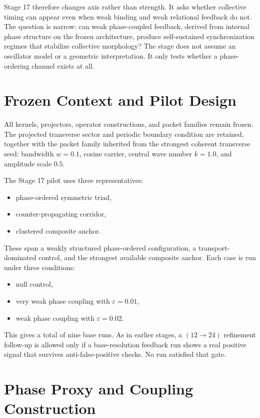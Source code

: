 \documentclass[11pt]{article}
\begin{document}
Stage 17 therefore changes axis rather than strength. It asks whether collective timing can appear even when weak binding and weak relational feedback do not. The question is narrow: can weak phase-coupled feedback, derived from internal phase structure on the frozen architecture, produce self-sustained synchronization regimes that stabilize collective morphology? The stage does not assume an oscillator model or a geometric interpretation. It only tests whether a phase-ordering channel exists at all.

\section{Frozen Context and Pilot Design}

All kernels, projectors, operator constructions, and packet families remain frozen. The projected transverse sector and periodic boundary condition are retained, together with the packet family inherited from the strongest coherent transverse seed: bandwidth $w=0.1$, cosine carrier, central wave number $k=1.0$, and amplitude scale $0.5$.

The Stage 17 pilot uses three representatives:
\begin{itemize}
\item phase-ordered symmetric triad,
\item counter-propagating corridor,
\item clustered composite anchor.
\end{itemize}

These span a weakly structured phase-ordered configuration, a transport-dominated control, and the strongest available composite anchor. Each case is run under three conditions:
\begin{itemize}
\item null control,
\item very weak phase coupling with $\varepsilon=0.01$,
\item weak phase coupling with $\varepsilon=0.02$.
\end{itemize}

This gives a total of nine base runs. As in earlier stages, a $(12 \rightarrow 24)$ refinement follow-up is allowed only if a base-resolution feedback run shows a real positive signal that survives anti-false-positive checks. No run satisfied that gate.

\section{Phase Proxy and Coupling Construction}
\end{document}
